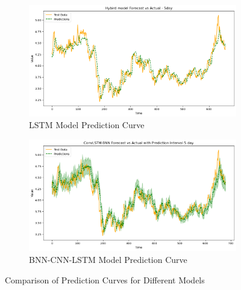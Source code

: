 \documentclass[final-report]{report-template}
\begin{document}
\begin{figure}[h]
    \centering
    \begin{subfigure}[b]{0.48\linewidth}
        \centering
        \includegraphics[width=\linewidth]{figures/lstm_prediction_curve.png}
        \caption{LSTM Model Prediction Curve}
        \label{fig:lstm_prediction_curve}
    \end{subfigure}
    \hfill
    \begin{subfigure}[b]{0.48\linewidth}
        \centering
        \includegraphics[width=\linewidth]{figures/bnn_prediction_curve.png}
        \caption{BNN-CNN-LSTM Model Prediction Curve}
        \label{fig:bnn_prediction_curve}
    \end{subfigure}
    \caption{Comparison of Prediction Curves for Different Models}
    \label{fig:combined_prediction_curves}
\end{figure}
\end{document}
